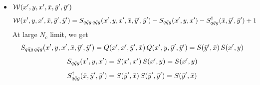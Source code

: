 \documentclass[9pt]{article}
\numberwithin{equation}{section}
\begin{document}
\begin{itemize}
\item $\mathcal{W}(x',y,x',\Bar{x},\Bar{y}',\Bar{y}')$
    \begin{align}
        \mathcal{W}(x',y,x',\Bar{x},\Bar{y}',\Bar{y}') & = S_{q\Bar{q}g\,q\Bar{q}g}(x',y,x',\Bar{x},\Bar{y}',\Bar{y}') -S_{q\Bar{q}g}(x',y,x') - S^{\dagger}_{q\Bar{q}g}(\Bar{x},\Bar{y}',\Bar{y}') + 1
    \end{align}
At large $N_{c}$ limit, we get
$$S_{q\Bar{q}g\,q\Bar{q}g}(x',y,x',\Bar{x},\Bar{y}',\Bar{y}') = Q(x',x',\Bar{y}',\Bar{x})\, Q(x',y,\Bar{y}',\Bar{y}') = S(\Bar{y}',\Bar{x})\, S(x',y) $$
$$S_{q\Bar{q}g}(x',y,x') = S(x',x')\, S(x',y) = S(x',y)$$
$$S^{\dagger}_{q\Bar{q}g}(\Bar{x},\Bar{y}',\Bar{y}') = S(\Bar{y}',\Bar{x})\, S(\Bar{y}',\Bar{y}') = S(\Bar{y}',\Bar{x}) $$
\end{itemize}
\end{document}
